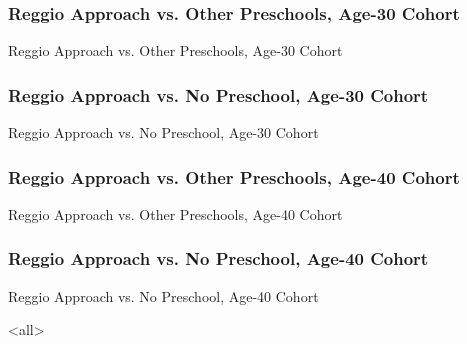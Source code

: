 \documentclass[static]{JJH-Beamer_PAGENOS}
\begin{document}
\begin{frame}
\frametitle{Reggio Approach vs. Other Preschools, Age-30 Cohort}
\centering
\begin{table}[H]
\caption{Reggio Approach vs. Other Preschools, Age-30 Cohort}
\end{table}
\end{frame}

\begin{frame}
\frametitle{Reggio Approach vs. No Preschool, Age-30 Cohort}
\centering
\begin{table}[H]
\caption{Reggio Approach vs. No Preschool, Age-30 Cohort}
\end{table}
\end{frame}

\begin{frame}
\frametitle{Reggio Approach vs. Other Preschools, Age-40 Cohort}
\centering
\begin{table}[H]
\caption{Reggio Approach vs. Other Preschools, Age-40 Cohort}
\end{table}
\end{frame}

\begin{frame}
\frametitle{Reggio Approach vs. No Preschool, Age-40 Cohort}
\centering
\begin{table}[H]
\caption{Reggio Approach vs. No Preschool, Age-40 Cohort}
\end{table}
\end{frame}



\mode<all>

\savebox\hiddenbib{\parbox{\textwidth}{}}
\end{document}

